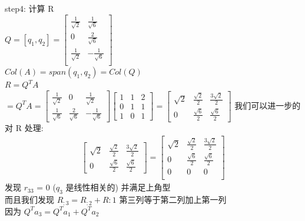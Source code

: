 \documentclass[12pt]{article}
\begin{document}
\begin{flushleft}
    step4: 计算 R \\
    $Q = [q_{1}, q_{2} ] =  \begin{bmatrix}
            \frac{1}{\sqrt{2}} & \frac{1}{\sqrt{6}}  \\
            0                  & \frac{2}{\sqrt{6}}  \\
            \frac{1}{\sqrt{2}} & -\frac{1}{\sqrt{6}} \\
        \end{bmatrix}$ \\
    $Col(A) = span(q_{1}, q_{2})  = Col(Q)$ \\
    $R = Q^{T}A$ \\
    $= Q^{T} A = \begin{bmatrix}
            \frac{1}{\sqrt{2}} & 0                  & \frac{1}{\sqrt{2}}  \\
            \frac{1}{\sqrt{6}} & \frac{2}{\sqrt{6}} & -\frac{1}{\sqrt{6}}
        \end{bmatrix}
        \begin{bmatrix}
            1 & 1 & 2 \\
            0 & 1 & 1 \\
            1 & 0 & 1
        \end{bmatrix}
        = \begin{bmatrix}
            \sqrt{2} & \frac{\sqrt{2}}{2} & \frac{3\sqrt{2}}{2} \\
            0        & \frac{\sqrt{6}}{2} & \frac{\sqrt{6}}{2}
        \end{bmatrix} $
    我们可以进一步的对 R 处理: \\
    \begin{align}
        \begin{bmatrix}
            \sqrt{2} & \frac{\sqrt{2}}{2} & \frac{3\sqrt{2}}{2} \\
            0        & \frac{\sqrt{6}}{2} & \frac{\sqrt{6}}{2}
        \end{bmatrix}
        =  \begin{bmatrix}
               \sqrt{2} & \frac{\sqrt{2}}{2} & \frac{3\sqrt{2}}{2} \\
               0        & \frac{\sqrt{6}}{2} & \frac{\sqrt{6}}{2}  \\
               0        & 0                  & 0                   \\
           \end{bmatrix}
    \end{align}
    发现 $r_{33}$ = 0 ($q_{3}$ 是线性相关的) 并满足上角型 \\
    而且我们发现 $R_{:3} = R_{:2} + R{:1}$ 第三列等于第二列加上第一列 \\
    因为 $Q^{T}a_{3} = Q^{T}a_{1} + Q^{T}a_{2}$


\end{flushleft}
\end{document}
